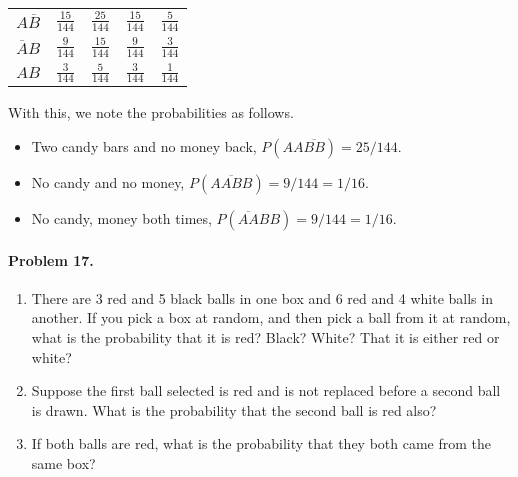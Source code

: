 \documentclass[10pt]{article}
\begin{document}
\begin{enumerate}
\begin{center}
\begin{tabular}{c|cccc}
                        $A\overline{B}$ & $\frac{15}{144}$ & $\frac{25}{144}$ & $\frac{15}{144}$ & $\frac{5}{144}$ \\
                        $\overline{A}B$ & $\frac{9}{144}$  & $\frac{15}{144}$ & $\frac{9}{144}$  & $\frac{3}{144}$ \\
                        $AB$            & $\frac{3}{144}$  & $\frac{5}{144}$  & $\frac{3}{144}$  & $\frac{1}{144}$
                \end{tabular}
                \end{center}
                With this, we note the probabilities as follows.
                \begin{itemize}
                        \item Two candy bars and no money back, $P(AA\overline{BB}) = 25 /144$.
                        \item No candy and no money, $P(\overline{AABB}) = 9 /144 = 1 /16$.
                        \item No candy, money both times, $P(\overline{AA}BB) = 9 /144 = 1 /16$.
                \end{itemize}
        \end{enumerate}

        \paragraph{Problem 17.}
        \begin{enumerate}
                \item There are 3 red and 5 black balls in one box and 6 red and 4 white balls in another.
                If you pick a box at random, and then pick a ball from it at random, what is the probability that it is red? Black? White?
                That it is either red or white?

                \item Suppose the first ball selected is red and is not replaced before a second ball is drawn.
                What is the probability that the second ball is red also?

                \item If both balls are red, what is the probability that they both came from the same box?
        \end{enumerate}
\end{document}
